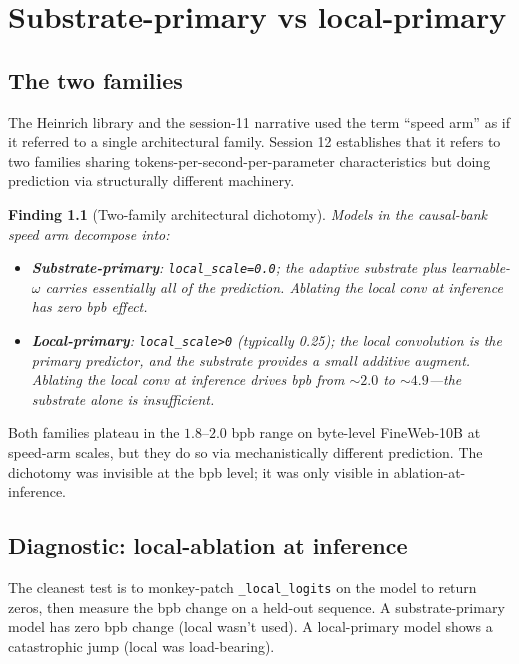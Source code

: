 \documentclass[11pt,openany]{book}
\newtheorem{finding}{Finding}[chapter]
\begin{document}
\chapter{Substrate-primary vs local-primary}
\label{ch:dichotomy}

\section{The two families}

The Heinrich library and the session-11 narrative used the term ``speed arm''
as if it referred to a single architectural family. Session 12 establishes
that it refers to two families sharing tokens-per-second-per-parameter
characteristics but doing prediction via structurally different machinery.

\begin{finding}[Two-family architectural dichotomy]
Models in the causal-bank speed arm decompose into:
\begin{itemize}
  \item \textbf{Substrate-primary}: \texttt{local\_scale=0.0}; the adaptive
  substrate plus learnable-$\omega$ carries essentially all of the prediction.
  Ablating the local conv at inference has zero bpb effect.
  \item \textbf{Local-primary}: \texttt{local\_scale>0} (typically 0.25); the
  local convolution is the primary predictor, and the substrate provides a
  small additive augment. Ablating the local conv at inference drives bpb
  from $\sim 2.0$ to $\sim 4.9$---the substrate alone is insufficient.
\end{itemize}
\end{finding}

Both families plateau in the $1.8$--$2.0$ bpb range on byte-level FineWeb-10B
at speed-arm scales, but they do so via mechanistically different prediction.
The dichotomy was invisible at the bpb level; it was only visible in
ablation-at-inference.

\section{Diagnostic: local-ablation at inference}

The cleanest test is to monkey-patch \texttt{\_local\_logits} on the model to
return zeros, then measure the bpb change on a held-out sequence. A
substrate-primary model has zero bpb change (local wasn't used). A
local-primary model shows a catastrophic jump (local was load-bearing).
\end{document}
